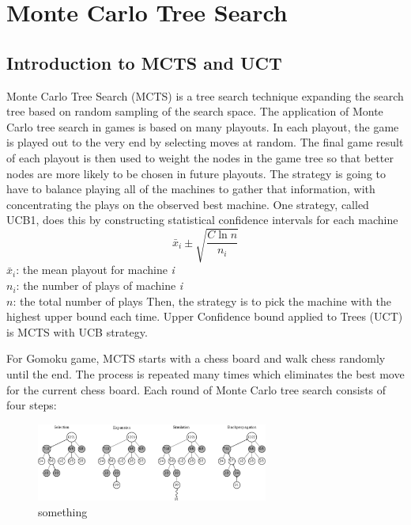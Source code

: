 \documentclass[11pt,a4paper]{article}
\begin{document}
\section{Monte Carlo Tree Search}
\subsection{Introduction to MCTS and UCT}
\par Monte Carlo Tree Search (MCTS) is a tree search technique expanding the search tree based on random sampling of the search space. The application of Monte Carlo tree search in games is based on many playouts. In each playout, the game is played out to the very end by selecting moves at random. The final game result of each playout is then used to weight the nodes in the game tree so that better nodes are more likely to be chosen in future playouts. The strategy is going to have to balance playing all of the machines to gather that information, with concentrating the plays on the observed best machine. One strategy, called UCB1, does this by constructing statistical confidence intervals for each machine
\begin{displaymath}
\bar{x}_i \pm \sqrt{\frac{C\ln n}{n_i}}
\end{displaymath}
$\bar{x}_i$: the mean playout for machine \emph{i}\\
$n_i$: the number of plays of machine \emph{i} \\
$n$: the total number of plays
Then, the strategy is to pick the machine with the highest upper bound each time. Upper Confidence bound applied to Trees (UCT)
is MCTS with UCB strategy.
\par For Gomoku game, MCTS starts with a chess board and walk chess randomly until the end. The process is repeated many times which eliminates the best move for the current chess board. Each round of Monte Carlo tree search consists of four steps:
\begin{figure}
\centering\includegraphics[width=3in]{1.png}
\caption{something}
\end{figure}
\end{document}
